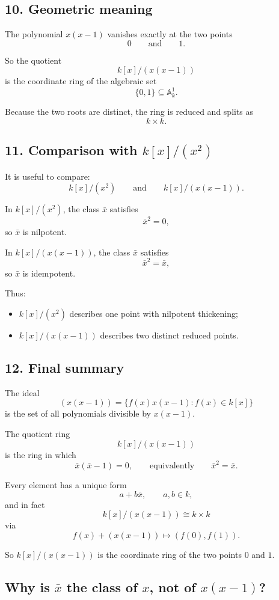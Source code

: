 \documentclass[12pt,a4paper]{article}
\theoremstyle{notespace}
\begin{document}
\subsection*{10. Geometric meaning}

The polynomial \(x(x-1)\) vanishes exactly at the two points
\[
0
\qquad\text{and}\qquad
1.
\]

So the quotient
\[
k[x]/(x(x-1))
\]
is the coordinate ring of the algebraic set
\[
\{0,1\}\subseteq \mathbb A_k^1.
\]

Because the two roots are distinct, the ring is reduced and splits as
\[
k\times k.
\]

\subsection*{11. Comparison with \(k[x]/(x^2)\)}

It is useful to compare:
\[
k[x]/(x^2)
\qquad\text{and}\qquad
k[x]/(x(x-1)).
\]

In \(k[x]/(x^2)\), the class \(\bar x\) satisfies
\[
\bar x^2=0,
\]
so \(\bar x\) is nilpotent.

In \(k[x]/(x(x-1))\), the class \(\bar x\) satisfies
\[
\bar x^2=\bar x,
\]
so \(\bar x\) is idempotent.

Thus:
\begin{itemize}
	\item \(k[x]/(x^2)\) describes one point with nilpotent thickening;
	\item \(k[x]/(x(x-1))\) describes two distinct reduced points.
\end{itemize}

\subsection*{12. Final summary}

The ideal
\[
(x(x-1))
=
\{f(x)x(x-1):f(x)\in k[x]\}
\]
is the set of all polynomials divisible by \(x(x-1)\).

The quotient ring
\[
k[x]/(x(x-1))
\]
is the ring in which
\[
\bar x(\bar x-1)=0,
\qquad\text{equivalently}\qquad
\bar x^2=\bar x.
\]

Every element has a unique form
\[
a+b\bar x,
\qquad a,b\in k,
\]
and in fact
\[
k[x]/(x(x-1))\cong k\times k
\]
via
\[
f(x)+(x(x-1))
\longmapsto
(f(0),f(1)).
\]

So \(k[x]/(x(x-1))\) is the coordinate ring of the two points \(0\) and \(1\).

\subsection*{Why is \(\bar x\) the class of \(x\), not of \(x(x-1)\)?}
\end{document}
